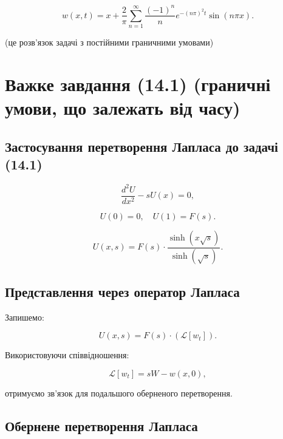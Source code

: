 \documentclass[
  ukrainian,
]{article}
\begin{document}
\[
w(x, t) = x + \frac{2}{\pi} \sum_{n=1}^{\infty} \frac{(-1)^n}{n} e^{-(n\pi)^2 t} \sin(n\pi x).
\]

(це розв'язок задачі з постійними граничними умовами)

\section{Важке завдання (14.1) (граничні умови, що залежать від
часу)}\label{ux432ux430ux436ux43aux435-ux437ux430ux432ux434ux430ux43dux43dux44f-14.1-ux433ux440ux430ux43dux438ux447ux43dux456-ux443ux43cux43eux432ux438-ux449ux43e-ux437ux430ux43bux435ux436ux430ux442ux44c-ux432ux456ux434-ux447ux430ux441ux443}

\subsection{Застосування перетворення Лапласа до задачі
(14.1)}\label{ux437ux430ux441ux442ux43eux441ux443ux432ux430ux43dux43dux44f-ux43fux435ux440ux435ux442ux432ux43eux440ux435ux43dux43dux44f-ux43bux430ux43fux43bux430ux441ux430-ux434ux43e-ux437ux430ux434ux430ux447ux456-14.1}

\[
\frac{d^2 U}{dx^2} - s U(x) = 0,
\]

\[
U(0) = 0, \quad U(1) = F(s).
\]

\[
U(x, s) = F(s)\cdot \frac{\sinh(x \sqrt{s})}{\sinh(\sqrt{s})}.
\]

\subsection{Представлення через оператор
Лапласа}\label{ux43fux440ux435ux434ux441ux442ux430ux432ux43bux435ux43dux43dux44f-ux447ux435ux440ux435ux437-ux43eux43fux435ux440ux430ux442ux43eux440-ux43bux430ux43fux43bux430ux441ux430}

Запишемо:

\[
U(x, s) = F(s) \cdot \left( \mathcal{L}[w_t] \right).
\]

Використовуючи співвідношення:

\[
\mathcal{L}[w_t] = s W - w(x, 0),
\]

отримуємо зв'язок для подальшого оберненого перетворення.

\subsection{Обернене перетворення
Лапласа}\label{ux43eux431ux435ux440ux43dux435ux43dux435-ux43fux435ux440ux435ux442ux432ux43eux440ux435ux43dux43dux44f-ux43bux430ux43fux43bux430ux441ux430}
\end{document}
